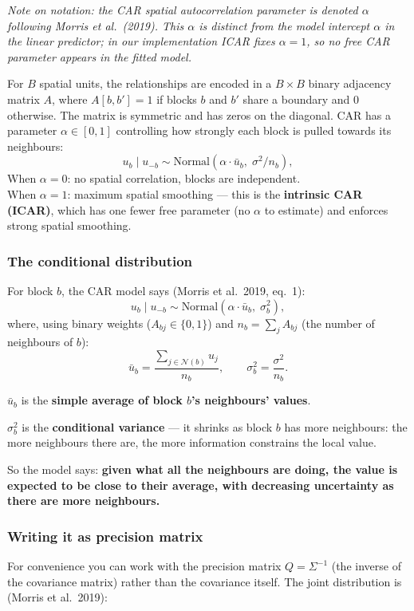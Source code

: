 \documentclass[12pt,a4paper]{article}
\begin{document}
\noindent\textit{Note on notation: the CAR spatial autocorrelation parameter is denoted $\alpha$ following Morris et al.\ (2019). This $\alpha$ is distinct from the model intercept $\alpha$ in the linear predictor; in our implementation ICAR fixes $\alpha=1$, so no free CAR parameter appears in the fitted model.}

For $B$ spatial units, the relationships are encoded in a $B \times B$ binary adjacency matrix $A$, where $A[b,b'] = 1$ if blocks $b$ and $b'$ share a boundary and 0 otherwise. The matrix is symmetric and has zeros on the diagonal. CAR has a parameter $\alpha \in [0,1]$ controlling how strongly each block is pulled towards its neighbours:
$$ u_b \mid u_{-b} \sim \text{Normal}(\alpha \cdot \bar{u}_b,\; \sigma^2/n_b), $$
When $\alpha = 0$: no spatial correlation, blocks are independent.\\
When $\alpha = 1$: maximum spatial smoothing --- this is the \textbf{intrinsic CAR (ICAR)}, which has one fewer free parameter (no $\alpha$ to estimate) and enforces strong spatial smoothing.

\subsubsection{The conditional distribution}
For block $b$, the CAR model says (Morris et al.\ 2019, eq.\ 1):
$$ u_b \mid u_{-b} \sim \text{Normal}(\alpha \cdot \bar{u}_b,\; \sigma_b^2), $$
where, using binary weights ($A_{bj} \in \{0,1\}$) and $n_b = \sum_j A_{bj}$ (the number of neighbours of $b$):
$$ \bar{u}_b = \frac{\sum_{j \in \mathcal{N}(b)} u_j}{n_b}, \qquad \sigma_b^2 = \frac{\sigma^2}{n_b}. $$

\noindent $\bar{u}_b$ is the \textbf{simple average of block $b$'s neighbours' values}.

\noindent $\sigma_b^2$ is the \textbf{conditional variance} — it shrinks as block $b$ has more neighbours: the more neighbours there are, the more information constrains the local value.

\noindent So the model says: \textbf{given what all the neighbours are doing, the value is expected to be close to their average, with decreasing uncertainty as there are more neighbours.}

\subsubsection{Writing it as precision matrix}
For convenience you can work with the precision matrix $Q = \Sigma^{-1}$ (the inverse of the covariance matrix) rather than the covariance itself. The joint distribution is (Morris et al.\ 2019):
\end{document}
